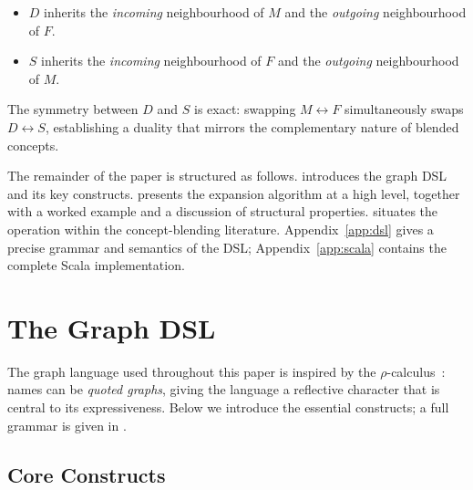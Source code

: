\documentclass[11pt, a4paper]{article}
\theoremstyle{definition}
\theoremstyle{plain}
\theoremstyle{remark}
\begin{document}
\begin{itemize}[leftmargin=2em]
  \item $D$ inherits the \emph{incoming} neighbourhood of $M$ and the
    \emph{outgoing} neighbourhood of $F$.
  \item $S$ inherits the \emph{incoming} neighbourhood of $F$ and the
    \emph{outgoing} neighbourhood of $M$.
\end{itemize}

The symmetry between $D$ and $S$ is exact: swapping $M \leftrightarrow F$
simultaneously swaps $D \leftrightarrow S$, establishing a duality that mirrors
the complementary nature of blended concepts.

The remainder of the paper is structured as follows.
 introduces the graph DSL and its key constructs.
 presents the expansion algorithm at a high level, together
with a worked example and a discussion of structural properties.
 situates the operation within the concept-blending
literature.
Appendix~\ref{app:dsl} gives a precise grammar and semantics of the DSL;
Appendix~\ref{app:scala} contains the complete Scala implementation.

\section{The Graph DSL}
\label{sec:dsl}

The graph language used throughout this paper is inspired by the
$\rho$-calculus~\cite{meredith2005}: names can be \emph{quoted graphs}, giving
the language a reflective character that is central to its expressiveness.
Below we introduce the essential constructs; a full grammar is given in
.

\subsection{Core Constructs}
\end{document}
